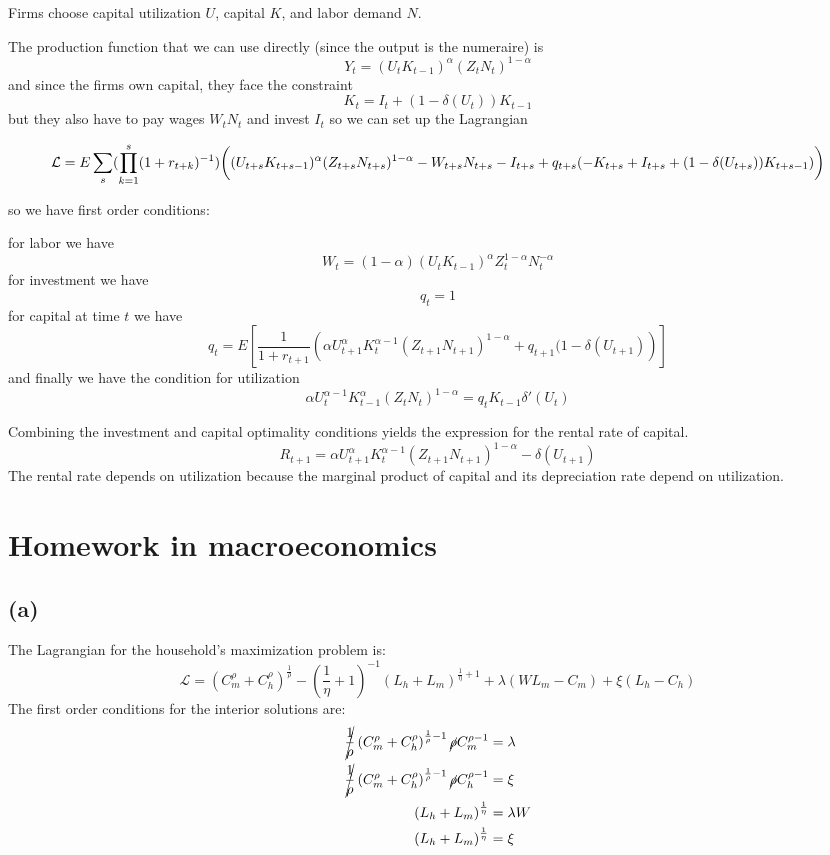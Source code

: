 \documentclass[11pt]{amsart}
\begin{document}
Firms choose capital utilization $U$, capital $K$, and labor demand $N$.

The production function that we can use directly (since the output is the numeraire) is
\[
Y_t = (U_t K_{t-1})^{\alpha} (Z_t N_t)^{1-\alpha}
\]
and since the firms own capital, they face the constraint
\[
K_t = I_t + (1 - \delta(U_t)) K_{t-1}
\]
but they also have to pay wages $W_t N_t$ and invest $I_t$
so we can set up the Lagrangian
\begin{tiny}
\[
\mathcal{L} = E \sum_s (\prod_{k=1}^s (1+r_{t+k})^{-1}) \bigg{(} (U_{t+s} K_{t+s-1})^{\alpha} (Z_{t+s} N_{t+s})^{1-\alpha} - W_{t+s} N_{t+s} - I_{t+s} + q_{t+s} (-K_{t+s} +  I_{t+s} + (1 - \delta(U_{t+s})) K_{t+s-1}) \bigg{)}
\]
\end{tiny}
so we have first order conditions:

for labor we have
\[
W_t = (1-\alpha) (U_{t} K_{t-1})^{\alpha} Z_{t}^{1-\alpha} N_t^{-\alpha}
\]
for investment we have
\[
q_t = 1
\]
for capital at time $t$ we have
\[
q_t = E \left[ \frac{1}{1+r_{t+1}} \left( \alpha U_{t+1}^{\alpha} K_t^{\alpha -1} (Z_{t+1} N_{t+1})^{1-\alpha} + q_{t+1} (1 - \delta(U_{t+1})  \right) \right]
\]
and finally we have the condition for utilization
\[
\alpha U_t^{\alpha - 1} K_{t-1}^{\alpha} (Z_{t} N_{t})^{1-\alpha} = q_t K_{t-1} \delta'(U_t)
\]

Combining the investment and capital optimality conditions yields the expression for the rental rate of capital. 
\[
	R_{t+1} = \alpha U_{t+1}^{\alpha} K_t^{\alpha -1} \left(Z_{t+1} N_{t+1}  \right)^{1-\alpha} - \delta(U_{t+1})
\]
The rental rate depends on utilization because the marginal product of capital and its depreciation rate depend on utilization. 

\section{Homework in macroeconomics}

\subsection*{(a)}

 The Lagrangian for the household's maximization problem is:
\[
	\mathcal{L} = \left( C_m^\rho + C_h^\rho \right)^{\frac{1}{\rho}} - \left( \frac{1}{\eta} + 1 \right)^{-1} \left(  L_h + L_m \right)^{\frac{1}{\eta} + 1} + \lambda \left( W L_m - C_m \right) + \xi \left(L_h - C_h \right)
\]
	The first order conditions for the interior solutions are:
	\begin{align*}
	\cancel{\frac{1}{\rho}}\left( C_m^\rho + C_h^\rho \right)^{\frac{1}{\rho} -1} \cancel{\rho}  C_m^{\rho-1} &= \lambda \\
	\cancel{\frac{1}{\rho}} \left( C_m^\rho + C_h^\rho \right)^{\frac{1}{\rho} -1} \cancel{\rho} C_h^{\rho-1} & = \xi \\
	\left(  L_h + L_m \right)^{\frac{1}{\eta} }  &=\lambda W \\
	\left(  L_h + L_m \right)^{\frac{1}{\eta} }  &= \xi 	 
	\end{align*}
\end{document}
